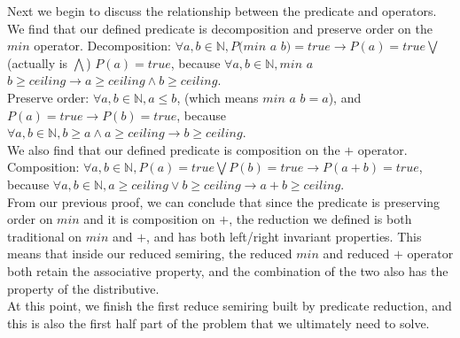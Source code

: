 \documentclass[a4paper,10pt]{article}
\begin{document}
Next we begin to discuss the relationship between the predicate and operators. \\
We find that our defined predicate is decomposition and preserve order on the $min$ operator.
Decomposition: $\forall a,b \in \mathbb{N}, P(min $ $a$ $b) = true \rightarrow P(a) = true \bigvee $(actually is $\bigwedge$) $P(a) = true$, because $\forall a,b \in \mathbb{N}, min $ $a$ $b \geq ceiling \rightarrow a \geq ceiling \wedge b \geq ceiling$.\\
Preserve order: $\forall a,b \in \mathbb{N}, a \leq b$, (which means $min $ $a$ $b = a$), and $P (a) = true \rightarrow P(b) = true$, because $\forall a,b \in \mathbb{N}, b \geq a \wedge a \geq ceiling \rightarrow b \geq ceiling$.\\
We also find that our defined predicate is composition on the $+$ operator.\\
Composition: $\forall a,b \in \mathbb{N}, P(a) = true \bigvee P(b) = true \rightarrow P(a + b) = true$, because $\forall a,b \in \mathbb{N}, a \geq ceiling \vee b \geq ceiling \rightarrow a + b \geq ceiling$.\\
From our previous proof, we can conclude that since the predicate is preserving order on $min$ and it is composition on $+$, the reduction we defined is both traditional on $min$ and $+$, and has both left/right invariant properties. 
This means that inside our reduced semiring, the reduced $min$ and reduced $+$ operator both retain the associative property, and the combination of the two also has the property of the distributive.\\
At this point, we finish the first reduce semiring built by predicate reduction, and this is also the first half part of the problem that we ultimately need to solve.\\
\end{document}
